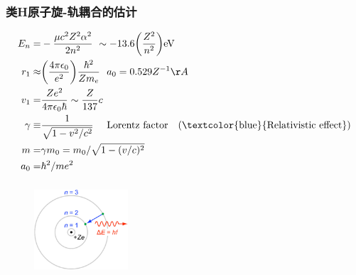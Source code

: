\frame
{
	\frametitle{类\textrm{H}原子旋-轨耦合的估计}
\begin{minipage}{0.58\textwidth}
	\begin{displaymath}
		\begin{aligned}
			E_n=&-\dfrac{\mu c^2Z^2\alpha^2}{2n^2}~\sim -13.6\bigg(\dfrac{Z^2}{n^2}\bigg)\mathrm{eV}\\
			r_1\approx&\bigg(\dfrac{4\pi\epsilon_0}{e^2}\bigg)\dfrac{\hbar^2}{Zm_e} ~~ a_0=0.529Z^{-1}\AA\\
			v_1=&\dfrac{Ze^2}{4\pi\epsilon_0\hbar}\sim \dfrac{Z}{137}c\\
			\gamma\equiv&\dfrac1{\sqrt{1-v^2/c^2}}~\quad \mbox{\textrm{Lorentz~factor\quad(\textcolor{blue}{Relativistic~effect})}}\\
			m=&\gamma m_0=m_0/\sqrt{1-(v/c)^2}\\
			a_0=&\hbar^2/me^2
		\end{aligned}
	\end{displaymath}
\end{minipage}
\begin{minipage}{0.40\textwidth}
\begin{figure}[h!]
\centering
\vspace{-0.9in}
\includegraphics[height=1.35in,width=1.38in,viewport=0 0 840 800,clip]{Figures/SOC_hydrogen-H_electron.png}
\label{SOC-hydrongen-like-2}
\end{figure}
\end{minipage}
}

